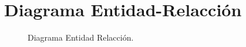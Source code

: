 \documentclass[a4paper,10pt]{article}
\begin{document}
\section{Diagrama Entidad-Relacción}

\begin{center}
	\begin{figure}[hbt]
		\begin{center}
			\scalebox{1}{}
		\end{center}
		\caption{Diagrama Entidad Relacción.}
		\label{fig:diagramaER}
	\end{figure}
\end{center}




\end{document}
